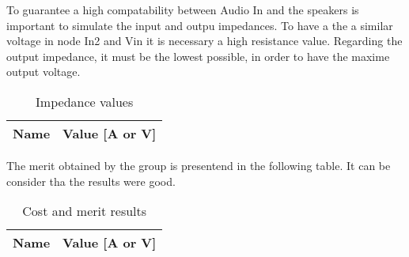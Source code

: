 \par To guarantee a high compatability between Audio In and the speakers is important to simulate the input and outpu impedances. To have a the a similar voltage in node In2 and Vin it is necessary a high resistance value. Regarding the output impedance, it must be the lowest possible, in order to have the maxime output voltage.

\begin{table}[!ht]
  \centering
  \begin{tabular}{|l|r|}
    \hline    
    {\bf Name} & {\bf Value [A or V]} \\ \hline
    
  \end{tabular}
  \caption{Impedance values}
  \label{tab:ng5}
\end{table}

\par The merit obtained by the group is presentend in the following table. It can be consider tha the results were good.

\begin{table}[!ht]
  \centering
  \begin{tabular}{|l|r|}
    \hline    
    {\bf Name} & {\bf Value [A or V]} \\ \hline
    
  \end{tabular}
  \caption{Cost and merit results}
  \label{tab:ngs1}
\end{table}


